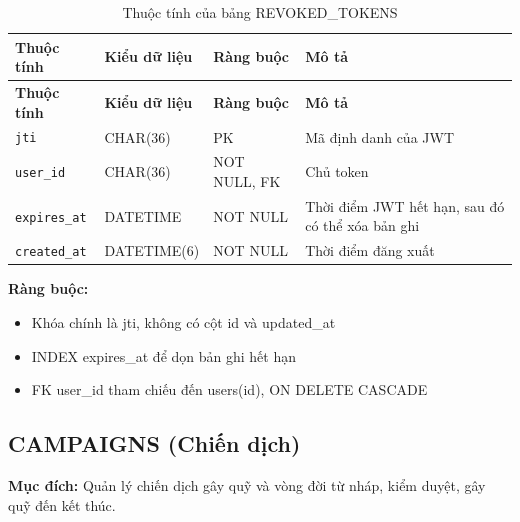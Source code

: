 {\small
\begin{longtable}{|P{3.2cm}|P{2.8cm}|P{2.2cm}|p{5.4cm}|}
    \caption{Thuộc tính của bảng REVOKED\_\allowbreak{}TOKENS}
    \label{tab:revoked_tokens} \\
    \hline
    \textbf{Thuộc tính} & \textbf{Kiểu dữ liệu} & \textbf{Ràng buộc} & \textbf{Mô tả} \\
    \hline
    \endfirsthead
    \hline
    \textbf{Thuộc tính} & \textbf{Kiểu dữ liệu} & \textbf{Ràng buộc} & \textbf{Mô tả} \\
    \hline
    \endhead

    \texttt{jti} & CHAR(36) & PK & Mã định danh của JWT \\
    \hline
    \texttt{user\_\allowbreak{}id} & CHAR(36) & NOT NULL, FK & Chủ token \\
    \hline
    \texttt{expires\_\allowbreak{}at} & DATETIME & NOT NULL & Thời điểm JWT hết hạn, sau đó có thể xóa bản ghi \\
    \hline
    \texttt{created\_\allowbreak{}at} & DATETIME(6) & NOT NULL & Thời điểm đăng xuất \\
    \hline
\end{longtable}
}

\textbf{Ràng buộc:}
\begin{itemize}
    \item Khóa chính là jti, không có cột id và updated\_\allowbreak{}at
    \item INDEX expires\_\allowbreak{}at để dọn bản ghi hết hạn
    \item FK user\_\allowbreak{}id tham chiếu đến users(id), ON DELETE CASCADE
\end{itemize}

\subsection{CAMPAIGNS (Chiến dịch)}

\textbf{Mục đích:} Quản lý chiến dịch gây quỹ và vòng đời từ nháp, kiểm duyệt, gây quỹ đến kết thúc.

